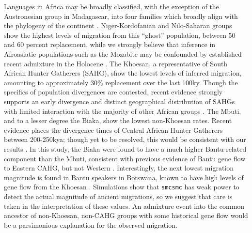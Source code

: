 \documentclass{article}
\begin{document}
Languages in Africa may be broadly classified, with the exception of the Austronesian group in Madagascar, into four families which broadly align with the phylogeny of the continent \cite{Blench2007, Fan2019}. Niger-Kordofanian and Nilo-Saharan groups show the highest levels of migration from this ``ghost'' population, between 50 and 60 percent replacement, while we strongly believe that inference in Afroasiatic populations such as the Mozabite may be confounded by established recent admixture in the Holocene \cite{Busby2016}. The Khoesan, a representative of South African Hunter Gatherers (SAHG), show the lowest levels of inferred migration, amounting to approximately 30\% replacement over the last 100ky. Though the specifics of population divergences are contested, recent evidence strongly supports an early divergence and distinct geographical distribution of SAHGs with limited interaction with the majority of other African groups \cite{Excoffier2013, Behar2008a, Batini2011, Shi2010, Schlebusch2012}. The Mbuti, and to a lesser degree the Biaka, show the lowest non-Khoesan rates. Recent evidence places the divergence times of Central African Hunter Gatherers between 200-250kya; though yet to be resolved, this would be consistent with our results \cite{Lipson2019}. In this study, the Biaka were found to have a much higher Bantu-related component than the Mbuti, consistent with previous evidence of Bantu gene flow to Eastern CAHG, but not Western \cite{Quintana-Murci2008}. Interestingly, the next lowest migration magnitude is found in Bantu speakers in Botswana, known to have high levels of gene flow from the Khoesan \cite{Patterson2012}. Simulations show that {\tt smcsmc} has weak power to detect the actual magnitude of ancient migrations, so we suggest that care is taken in the interpretation of these values. An admixture event into the common ancestor of non-Khoesan, non-CAHG groups with some historical gene flow would be a parsimonious explanation for the observed migration. 
\end{document}
